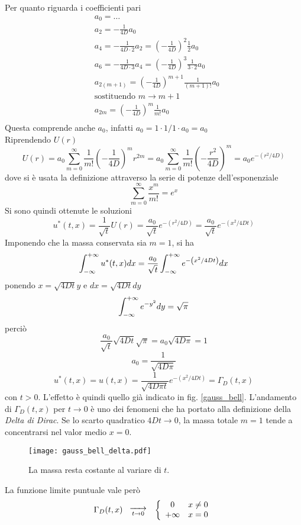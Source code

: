 Per quanto riguarda i coefficienti pari
\begin{align*}
	& a_0=\ldots \\
	& a_2= - \frac{1}{4D} a_0 \\
	& a_4= - \frac{1}{4D \cdot 2} a_2 = \left( -\frac{1}{4D} \right)^2
	\frac{1}{2} a_0 \\
	& a_6= - \frac{1}{4D \cdot 3} a_4 = \left( -\frac{1}{4D} \right)^3
	\frac{1}{3 \cdot 2} a_0 \\
	& a_{2(m+1)}= \left( -\frac{1}{4D} \right)^{m+1}
	\frac{1}{(m+1)!} a_0 \\
	& \text{sostituendo }m \rightarrow m+1 \\
	& a_{2m}= \left( -\frac{1}{4D} \right)^{m}
	\frac{1}{m!} a_0 \\
\end{align*}
Questa comprende anche $a_0$, infatti $a_0= 1 \cdot 1/1 \cdot a_0= a_0$\\
Riprendendo $U(r)$
\[
	U(r)= a_0 \sum_{m=0}^{\infty} \frac{1}{m!}
	\left( -\frac{1}{4D} \right)^m r^{2m}
	= a_0 \sum_{m=0}^{\infty} \frac{1}{m!}
	\left( -\frac{r^2}{4D} \right)^m
	= a_0 e^{- \left( r^2/4D \right)}
\]
dove si \`e usata la definizione attraverso la serie di potenze
dell'esponenziale
\[
	\sum_{m=0}^{\infty} \frac{x^m}{m!}= e^x
\]
Si sono quindi ottenute le soluzioni
\[
	u^*(t,x)= \frac{1}{\sqrt{t}}U(r)= \frac{a_0}{\sqrt{t}}
	e^{- \left( r^2/4D \right)}
	= \frac{a_0}{\sqrt{t}} e^{- \left( x^2/4Dt \right)}
\]
Imponendo che la massa conservata sia $m=1$, si ha
\[
	\int_{- \infty}^{+ \infty} u^*(t,x) dx= \frac{a_0}{\sqrt{t}}
	\int_{- \infty}^{+ \infty} e^{-\left( x^2/4Dt \right)} dx
\]
ponendo $x= \sqrt{4Dt}y$ e $dx= \sqrt{4Dt} dy$
\[
	\int_{- \infty}^{+ \infty} e^{-y^2}dy= \sqrt{\pi}
\]
perci\`o
\[
	\frac{a_0}{\sqrt{t}}\sqrt{4Dt}\sqrt{\pi}=a_0\sqrt{4D\pi}=1
\]
\[
	a_0= \frac{1}{\sqrt{4D\pi}}
\]
\[
	u^*(t,x)= u(t,x)= \frac{1}{\sqrt{4D\pi t}}
	e^{-\left( x^2/4Dt \right)}
	= \Gamma_D(t,x)
\]
con $t>0$. L'effetto \`e quindi quello gi\`a indicato in fig. \ref{gauss_bell}.
L'andamento di $\Gamma_D(t,x)$ per $t \rightarrow 0$ \`e uno dei fenomeni che
ha portato alla definizione della \textit{Delta di Dirac}.
Se lo scarto quadratico $4Dt \rightarrow 0$, la massa totale $m=1$ tende
a concentrarsi nel valor medio $x=0$.
\begin{figure}[H]
	\centering
	\texttt{[image: gauss\_bell\_delta.pdf]}
	\caption{La massa resta costante al variare di $t$.}
	\label{gauss_bell_delta}
\end{figure}
\noindent
La funzione limite puntuale vale per\`o
\[
	\Gamma_D(t,x)
	\;\;\;
	\substack{\xrightarrow{\hspace*{5mm}} \\ t\rightarrow 0}
	\;\;\;
	\left\{
		\begin{array}{cl}
			0 		& x \neq 0 \\
			+ \infty	& x= 0 \\
		\end{array}
	\right.
\]
